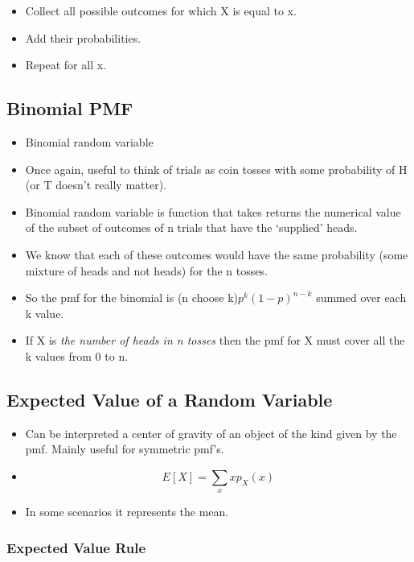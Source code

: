 \documentclass[11pt]{article}
\begin{document}
\begin{itemize}
\tightlist
\item
  Collect all possible outcomes for which X is equal to x.
\item
  Add their probabilities.
\item
  Repeat for all x.
\end{itemize}

\hypertarget{binomial-pmf}{%
\subsection{Binomial PMF}\label{binomial-pmf}}

\begin{itemize}
\tightlist
\item
  Binomial random variable
\item
  Once again, useful to think of trials as coin tosses with some
  probability of H (or T doesn't really matter).
\item
  Binomial random variable is function that takes returns the numerical
  value of the subset of outcomes of n trials that have the `supplied'
  heads.
\item
  We know that each of these outcomes would have the same probability
  (some mixture of heads and not heads) for the n tosses.
\item
  So the pmf for the binomial is (n choose k)\(p^{k}(1-p)^{n-k}\) summed
  over each k value.
\item
  If X is \emph{the number of heads in n tosses} then the pmf for X must
  cover all the k values from 0 to n.
\end{itemize}

\hypertarget{expected-value-of-a-random-variable}{%
\subsection{Expected Value of a Random
Variable}\label{expected-value-of-a-random-variable}}

\begin{itemize}
\tightlist
\item
  Can be interpreted a center of gravity of an object of the kind given
  by the pmf. Mainly useful for symmetric pmf's.
\item
  \[E[X] = \sum_xxp_X(x)\]
\item
  In some scenarios it represents the mean.
\end{itemize}

\hypertarget{expected-value-rule}{%
\subsubsection{Expected Value Rule}\label{expected-value-rule}}
\end{document}
